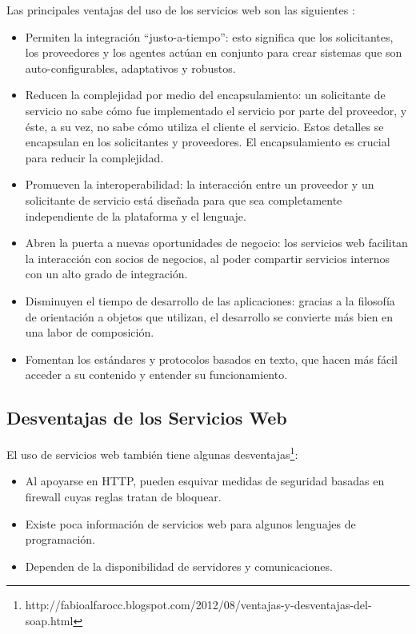 	Las principales ventajas del uso de los servicios web son las siguientes \citep{doctorado2005}:
\begin{itemize}
	\item Permiten la integración “justo-a-tiempo”:  esto significa que los solicitantes, los proveedores y los agentes actúan en conjunto para crear sistemas que son auto-configurables, adaptativos y robustos.
	\item Reducen la complejidad por medio del encapsulamiento: un solicitante de servicio no sabe cómo fue implementado el servicio por parte del proveedor, y éste, a su vez, no sabe cómo utiliza el cliente el servicio. Estos detalles se encapsulan en los solicitantes y proveedores. El encapsulamiento es crucial para reducir la complejidad.
	\item Promueven la interoperabilidad: la interacción entre un proveedor y un solicitante de servicio está diseñada para que sea completamente independiente de la plataforma y el lenguaje. 
	\item Abren la puerta a nuevas oportunidades de negocio: los servicios web facilitan la interacción con socios de negocios, al poder compartir servicios internos con un alto grado de integración.
	\item Disminuyen el tiempo de desarrollo de las aplicaciones: gracias a la filosofía de orientación a objetos que utilizan, el desarrollo se convierte más bien en una labor de composición.
	\item Fomentan los estándares y protocolos basados en texto, que hacen más fácil acceder a su contenido y entender su funcionamiento.
\end{itemize}


\subsection{Desventajas de los  Servicios Web}
\label{cap:subsec:desventajasserviciosweb}
	El uso de servicios web también tiene algunas desventajas\footnote{http://fabioalfarocc.blogspot.com/2012/08/ventajas-y-desventajas-del-soap.html}:
\begin{itemize}
	\item Al apoyarse en HTTP, pueden esquivar medidas de seguridad basadas en firewall cuyas reglas tratan de bloquear.
	\item Existe poca información de servicios web para algunos lenguajes de programación.
	\item Dependen de la disponibilidad de servidores y comunicaciones.
\end{itemize}

